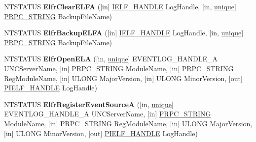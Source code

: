 \begin{DoxyCompactItemize}
\item 
\mbox{\label{interfaceeventlog_a86b764563354c82b1f2e6e1bd372af36}} 
N\+T\+S\+T\+A\+T\+US {\bfseries Elfr\+Clear\+E\+L\+FA} (\mbox{[}in\mbox{]} \hyperlink{interfacevoid}{I\+E\+L\+F\+\_\+\+H\+A\+N\+D\+LE} Log\+Handle, \mbox{[}in, \hyperlink{interfaceunique}{unique}\mbox{]} \hyperlink{struct___r_p_c___s_t_r_i_n_g}{P\+R\+P\+C\+\_\+\+S\+T\+R\+I\+NG} Backup\+File\+Name)
\item 
\mbox{\label{interfaceeventlog_ac26f22967e95aa94cd8c99ebce7bf30e}} 
N\+T\+S\+T\+A\+T\+US {\bfseries Elfr\+Backup\+E\+L\+FA} (\mbox{[}in\mbox{]} \hyperlink{interfacevoid}{I\+E\+L\+F\+\_\+\+H\+A\+N\+D\+LE} Log\+Handle, \mbox{[}in, \hyperlink{interfaceunique}{unique}\mbox{]} \hyperlink{struct___r_p_c___s_t_r_i_n_g}{P\+R\+P\+C\+\_\+\+S\+T\+R\+I\+NG} Backup\+File\+Name)
\item 
\mbox{\label{interfaceeventlog_a8e132a8886769f42ede0bdd5aeba3bbd}} 
N\+T\+S\+T\+A\+T\+US {\bfseries Elfr\+Open\+E\+LA} (\mbox{[}in, \hyperlink{interfaceunique}{unique}\mbox{]} E\+V\+E\+N\+T\+L\+O\+G\+\_\+\+H\+A\+N\+D\+L\+E\+\_\+A U\+N\+C\+Server\+Name, \mbox{[}in\mbox{]} \hyperlink{struct___r_p_c___s_t_r_i_n_g}{P\+R\+P\+C\+\_\+\+S\+T\+R\+I\+NG} Module\+Name, \mbox{[}in\mbox{]} \hyperlink{struct___r_p_c___s_t_r_i_n_g}{P\+R\+P\+C\+\_\+\+S\+T\+R\+I\+NG} Reg\+Module\+Name, \mbox{[}in\mbox{]} U\+L\+O\+NG Major\+Version, \mbox{[}in\mbox{]} U\+L\+O\+NG Minor\+Version, \mbox{[}out\mbox{]} \hyperlink{interfacevoid}{P\+I\+E\+L\+F\+\_\+\+H\+A\+N\+D\+LE} Log\+Handle)
\item 
\mbox{\label{interfaceeventlog_a957f607d7c6852981b6034f0105572f3}} 
N\+T\+S\+T\+A\+T\+US {\bfseries Elfr\+Register\+Event\+SourceA} (\mbox{[}in, \hyperlink{interfaceunique}{unique}\mbox{]} E\+V\+E\+N\+T\+L\+O\+G\+\_\+\+H\+A\+N\+D\+L\+E\+\_\+A U\+N\+C\+Server\+Name, \mbox{[}in\mbox{]} \hyperlink{struct___r_p_c___s_t_r_i_n_g}{P\+R\+P\+C\+\_\+\+S\+T\+R\+I\+NG} Module\+Name, \mbox{[}in\mbox{]} \hyperlink{struct___r_p_c___s_t_r_i_n_g}{P\+R\+P\+C\+\_\+\+S\+T\+R\+I\+NG} Reg\+Module\+Name, \mbox{[}in\mbox{]} U\+L\+O\+NG Major\+Version, \mbox{[}in\mbox{]} U\+L\+O\+NG Minor\+Version, \mbox{[}out\mbox{]} \hyperlink{interfacevoid}{P\+I\+E\+L\+F\+\_\+\+H\+A\+N\+D\+LE} Log\+Handle)
\item 
\mbox{\label{interfaceeventlog_ae5e40681af36fe4554a85f7137e2a412}} 

\end{DoxyCompactItemize}
